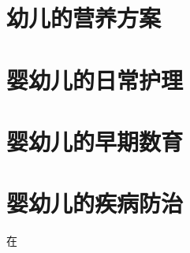\documentclass{book}
\begin{document}
\chapter{幼儿的营养方案}
\chapter{婴幼儿的日常护理}
\chapter{婴幼儿的早期数育}
\chapter{婴幼儿的疾病防治}




在
% 
\end{document}
